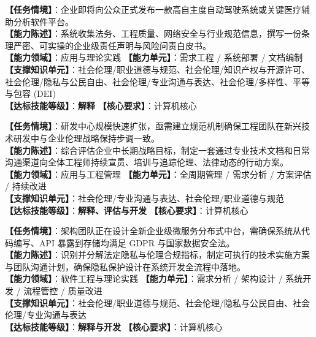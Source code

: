 \begin{taskbox}
\textbf{【任务情境】}：企业即将向公众正式发布一款高自主度自动驾驶系统或关键医疗辅助分析软件平台。\\
\textbf{【能力陈述】}：系统收集法务、工程质量、网络安全与行业规范信息，撰写一份条理严密、可实操的企业级责任声明与风险问责白皮书。\\
\textbf{【能力领域】}：应用与理论实践 \quad \textbf{【能力单元】}：需求工程 / 系统部署 / 文档编制\\
\textbf{【支撑知识单元】}：社会伦理/职业道德与规范、社会伦理/知识产权与开源许可、社会伦理/隐私与公民自由、社会伦理/专业沟通与表达、社会伦理/多样性、平等与包容 (DEI)\\
\textbf{【达标技能等级】}：\textbf{解释} \quad \textbf{【核心要求】}：计算机核心
\end{taskbox}

\begin{taskbox}
\textbf{【任务情境】}：研发中心规模快速扩张，亟需建立规范机制确保工程团队在新兴技术研发中与企业伦理战略保持步调一致。\\
\textbf{【能力陈述】}：综合评估企业中长期战略目标，制定一套通过专业技术文档和日常沟通渠道向全体工程师持续宣贯、培训与追踪伦理、法律动态的行动方案。\\
\textbf{【能力领域】}：应用与工程管理 \quad \textbf{【能力单元】}：全周期管理 / 需求分析 / 方案评估 / 持续改进\\
\textbf{【支撑知识单元】}：社会伦理/专业沟通与表达、社会伦理/职业道德与规范\\
\textbf{【达标技能等级】}：\textbf{解释、评估与开发} \quad \textbf{【核心要求】}：计算机核心
\end{taskbox}

\begin{taskbox}[任务 6：将合法合规的隐私保护要求深度融入系统研发生命周期]
\textbf{【任务情境】}：架构团队正在设计全新企业级微服务分布式中台，需确保系统从代码编写、API 暴露到存储均满足 GDPR 与国家数据安全法。\\
\textbf{【能力陈述】}：识别并分解法定隐私与伦理合规指标，制定可执行的技术实施方案与团队沟通计划，确保隐私保护设计在系统开发全流程中落地。\\
\textbf{【能力领域】}：软件工程与理论实践 \quad \textbf{【能力单元】}：需求分析 / 架构设计 / 系统开发 / 流程管控 / 质量改进\\
\textbf{【支撑知识单元】}：社会伦理/职业道德与规范、社会伦理/隐私与公民自由、社会伦理/专业沟通与表达\\
\textbf{【达标技能等级】}：\textbf{解释与开发} \quad \textbf{【核心要求】}：计算机核心
\end{taskbox}

